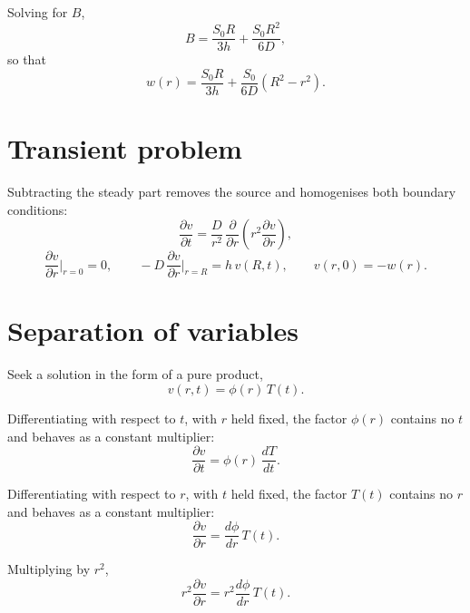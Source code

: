 \documentclass[11pt,a4paper]{article}
\begin{document}
Solving for $B$,
\begin{equation}
B = \frac{S_{0}R}{3h} + \frac{S_{0}R^{2}}{6D} ,
\end{equation}
so that
\begin{equation}
\boxed{\;
w(r) = \frac{S_{0}R}{3h} + \frac{S_{0}}{6D}\left(R^{2} - r^{2}\right) .
\;}
\label{eq:w}
\end{equation}

\section{Transient problem}

Subtracting the steady part removes the source and homogenises both boundary
conditions:
\begin{equation}
\frac{\partial v}{\partial t}
= \frac{D}{r^{2}}\,\frac{\partial}{\partial r}\!\left(r^{2}\frac{\partial v}{\partial r}\right) ,
\label{eq:vpde}
\end{equation}
\begin{equation}
\frac{\partial v}{\partial r}\bigg|_{r=0} = 0 ,
\qquad
-D\,\frac{\partial v}{\partial r}\bigg|_{r=R} = h\,v(R,t) ,
\qquad
v(r,0) = -w(r) .
\label{eq:vdata}
\end{equation}

\section{Separation of variables}
\label{sec:separation}

Seek a solution in the form of a pure product,
\begin{equation}
v(r,t) = \phi(r)\,T(t) .
\end{equation}

Differentiating with respect to $t$, with $r$ held fixed, the factor $\phi(r)$
contains no $t$ and behaves as a constant multiplier:
\begin{equation}
\frac{\partial v}{\partial t} = \phi(r)\,\frac{dT}{dt} .
\end{equation}

Differentiating with respect to $r$, with $t$ held fixed, the factor $T(t)$
contains no $r$ and behaves as a constant multiplier:
\begin{equation}
\frac{\partial v}{\partial r} = \frac{d\phi}{dr}\,T(t) .
\end{equation}

Multiplying by $r^{2}$,
\begin{equation}
r^{2}\frac{\partial v}{\partial r} = r^{2}\frac{d\phi}{dr}\,T(t) .
\end{equation}
\end{document}
